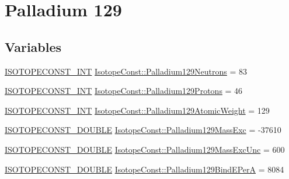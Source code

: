 \hypertarget{group___isotope_const-_palladium-_pd129}{}\section{Palladium 129}
\label{group___isotope_const-_palladium-_pd129}
\subsection*{Variables}
\begin{DoxyCompactItemize}
\item 
\mbox{\hyperlink{group___isotope_const-_macros_ga5f18360b3e99483a35c32d789e62621c}{I\+S\+O\+T\+O\+P\+E\+C\+O\+N\+S\+T\+\_\+\+I\+NT}} \mbox{\hyperlink{group___isotope_const-_palladium-_pd129_gadda6b6574b3cb165d64b609db87559c1}{Isotope\+Const\+::\+Palladium129\+Neutrons}} = 83
\item 
\mbox{\hyperlink{group___isotope_const-_macros_ga5f18360b3e99483a35c32d789e62621c}{I\+S\+O\+T\+O\+P\+E\+C\+O\+N\+S\+T\+\_\+\+I\+NT}} \mbox{\hyperlink{group___isotope_const-_palladium-_pd129_ga8cae33f757805cdcd7e59dd0db162c90}{Isotope\+Const\+::\+Palladium129\+Protons}} = 46
\item 
\mbox{\hyperlink{group___isotope_const-_macros_ga5f18360b3e99483a35c32d789e62621c}{I\+S\+O\+T\+O\+P\+E\+C\+O\+N\+S\+T\+\_\+\+I\+NT}} \mbox{\hyperlink{group___isotope_const-_palladium-_pd129_ga43efbb494d5f154a6a8f9bc98a527fc3}{Isotope\+Const\+::\+Palladium129\+Atomic\+Weight}} = 129
\item 
\mbox{\hyperlink{group___isotope_const-_macros_ga8f45a7272ce02c0b4c65c44636ed719a}{I\+S\+O\+T\+O\+P\+E\+C\+O\+N\+S\+T\+\_\+\+D\+O\+U\+B\+LE}} \mbox{\hyperlink{group___isotope_const-_palladium-_pd129_ga38e30aa04c4e92d922c0029a69607bfb}{Isotope\+Const\+::\+Palladium129\+Mass\+Exc}} = -\/37610
\item 
\mbox{\hyperlink{group___isotope_const-_macros_ga8f45a7272ce02c0b4c65c44636ed719a}{I\+S\+O\+T\+O\+P\+E\+C\+O\+N\+S\+T\+\_\+\+D\+O\+U\+B\+LE}} \mbox{\hyperlink{group___isotope_const-_palladium-_pd129_gabe421fce72fa6877cb46818cda783f55}{Isotope\+Const\+::\+Palladium129\+Mass\+Exc\+Unc}} = 600
\item 
\mbox{\hyperlink{group___isotope_const-_macros_ga8f45a7272ce02c0b4c65c44636ed719a}{I\+S\+O\+T\+O\+P\+E\+C\+O\+N\+S\+T\+\_\+\+D\+O\+U\+B\+LE}} \mbox{\hyperlink{group___isotope_const-_palladium-_pd129_ga457166c71a8867698d17e86037c0d488}{Isotope\+Const\+::\+Palladium129\+Bind\+E\+PerA}} = 8084
\item 

\end{DoxyCompactItemize}
